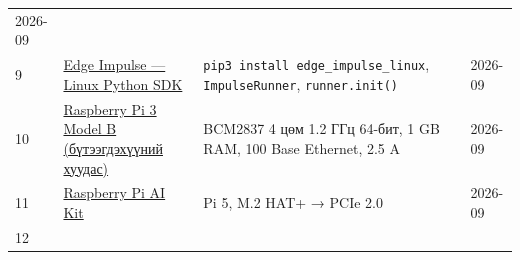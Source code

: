 \begin{longtable}[]{@{}llll@{}}
\begin{minipage}[t]{0.22\columnwidth}
2026-09\strut
\end{minipage}\tabularnewline
\begin{minipage}[t]{0.22\columnwidth}\raggedright
9\strut
\end{minipage} & \begin{minipage}[t]{0.22\columnwidth}\raggedright
\href{https://docs.edgeimpulse.com/tools/libraries/sdks/inference/linux/python}{Edge Impulse --- Linux Python SDK}\strut
\end{minipage} & \begin{minipage}[t]{0.22\columnwidth}\raggedright
\texttt{pip3\ install\ edge\_\allowbreak{}impulse\_\allowbreak{}linux}, \texttt{ImpulseRunner}, \texttt{runner.init()}\strut
\end{minipage} & \begin{minipage}[t]{0.22\columnwidth}\raggedright
2026-09\strut
\end{minipage}\tabularnewline
\begin{minipage}[t]{0.22\columnwidth}\raggedright
10\strut
\end{minipage} & \begin{minipage}[t]{0.22\columnwidth}\raggedright
\href{https://www.raspberrypi.com/products/raspberry-pi-3-model-b/}{Raspberry Pi 3 Model B (бүтээгдэхүүний хуудас)}\strut
\end{minipage} & \begin{minipage}[t]{0.22\columnwidth}\raggedright
BCM2837 4 цөм 1.2 ГГц 64-бит, 1 GB RAM, 100 Base Ethernet, 2.5 A\strut
\end{minipage} & \begin{minipage}[t]{0.22\columnwidth}\raggedright
2026-09\strut
\end{minipage}\tabularnewline
\begin{minipage}[t]{0.22\columnwidth}\raggedright
11\strut
\end{minipage} & \begin{minipage}[t]{0.22\columnwidth}\raggedright
\href{https://www.raspberrypi.com/products/ai-kit/}{Raspberry Pi AI Kit}\strut
\end{minipage} & \begin{minipage}[t]{0.22\columnwidth}\raggedright
Pi 5, M.2 HAT+ → PCIe 2.0\strut
\end{minipage} & \begin{minipage}[t]{0.22\columnwidth}\raggedright
2026-09\strut
\end{minipage}\tabularnewline
\begin{minipage}[t]{0.22\columnwidth}\raggedright
12\strut

\end{minipage}
\end{longtable}
